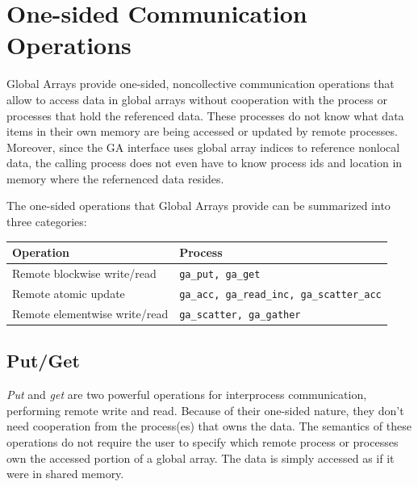 \chapter{One-sided Communication Operations}

Global Arrays provide one-sided, noncollective communication operations
that allow to access data in global arrays without cooperation with
the process or processes that hold the referenced data. These processes
do not know what data items in their own memory are being accessed
or updated by remote processes. Moreover, since the GA interface uses
global array indices to reference nonlocal data, the calling process
does not even have to know process ids and location in memory where
the refernenced data resides.

The one-sided operations that Global Arrays provide can be summarized
into three categories: 

\begin{tabular}{|>{\centering}p{4cm}|>{\centering}p{4cm}|}
\hline 
Operation & Process\tabularnewline
\hline
\hline 
Remote blockwise write/read & \texttt{ga\_put, ga\_get}\tabularnewline
\hline 
Remote atomic update & \texttt{ga\_acc, ga\_read\_inc, ga\_scatter\_acc}\tabularnewline
\hline 
Remote elementwise write/read & \texttt{ga\_scatter, ga\_gather}\tabularnewline
\hline
\end{tabular}


\section{Put/Get }

\emph{Put} and \emph{get} are two powerful operations for interprocess
communication, performing remote write and read. Because of their
one-sided nature, they don't need cooperation from the process(es)
that owns the data. The semantics of these operations do not require
the user to specify which remote process or processes own the accessed
portion of a global array. The data is simply accessed as if it were
in shared memory.

